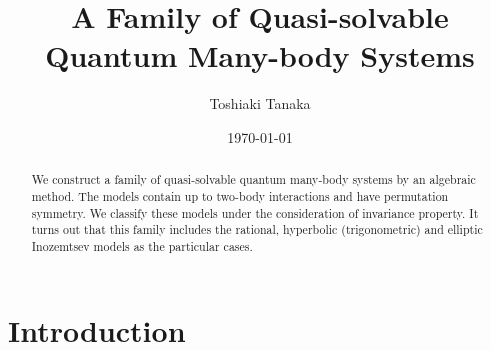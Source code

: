 \documentclass[a4paper,preprint,amsfonts,amssymb,amsmath,%
tightenlines,nofootinbib,noshowpacs]{revtex4}
\begin{document}

\title{A Family of Quasi-solvable Quantum Many-body Systems}

\author{Toshiaki Tanaka}


\date{\today}

\begin{abstract}
We construct a family of quasi-solvable quantum many-body systems
by an algebraic method. The models contain up to two-body interactions
and have permutation symmetry. We classify these models under the
consideration of invariance property. It turns out that this family
includes the rational, hyperbolic (trigonometric) and elliptic
Inozemtsev models as the particular cases.
\end{abstract}




\maketitle%


\section{\label{sec:intro}Introduction}
\end{document}
